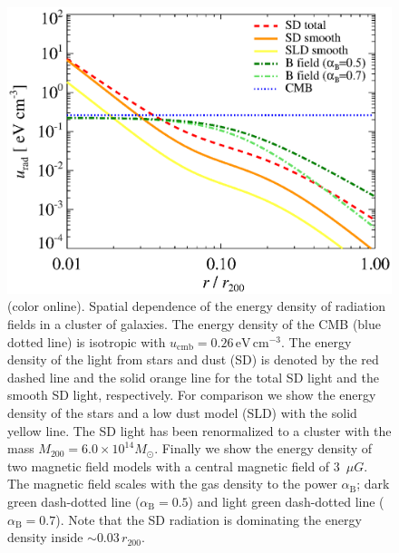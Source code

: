 \documentclass[10pt,aps,pra,reprint,amsmath,amsfonts,amssymb,showpacs,nofootinbib,floatfix]{revtex4-1}
\newcommand{\rmn}{\mathrm}
\newcommand{\msun}{M_\odot}
\newcommand{\colo}{(color online). }
\newcommand{\rvir}{r_{200}}
\newcommand{\mvir}{M_{200}}
\begin{document}
\begin{figure}%
 \includegraphics[width=0.99\columnwidth]{figures/ucool.bw.eps}
 \caption{\colo Spatial dependence of the energy density
   of radiation fields in a cluster of galaxies. The energy density of
   the CMB (blue dotted line) is isotropic with
   $u_\rmn{cmb}=0.26\,\rmn{eV}\,\rmn{cm}^{-3}$. The energy density of
   the light from stars and dust (SD) is denoted by the red dashed
   line and the solid orange line for the total SD light and the
   smooth SD light, respectively. For comparison we show the energy
   density of the stars and a low dust model (SLD) with the solid
   yellow line. The SD light has been renormalized to a cluster with
   the mass $\mvir=6.0\times10^{14}\msun$. Finally we show the energy
   density of two magnetic field models with a central magnetic field
   of 3~$\mu G$. The magnetic field scales with the gas density to the
   power $\alpha_\rmn{B}$; dark green dash-dotted line
   ($\alpha_\rmn{B}=0.5$) and light green dash-dotted line
   ($\alpha_\rmn{B}=0.7$). Note that the SD radiation is dominating
   the energy density inside $\sim0.03\,\rvir$.}
 \label{fig:SD_Edens}
\end{figure}
\end{document}
